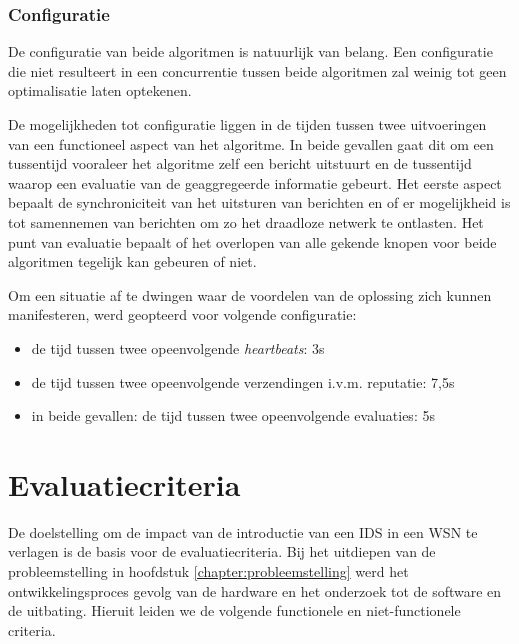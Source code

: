 \subsubsection{Configuratie}

De configuratie van beide algoritmen is natuurlijk van belang. Een configuratie
die niet resulteert in een concurrentie tussen beide algoritmen zal weinig tot
geen optimalisatie laten optekenen.

De mogelijkheden tot configuratie liggen in de tijden tussen twee uitvoeringen
van een functioneel aspect van het algoritme. In beide gevallen gaat dit om een
tussentijd vooraleer het algoritme zelf een bericht uitstuurt en de tussentijd
waarop een evaluatie van de geaggregeerde informatie gebeurt. Het eerste aspect
bepaalt de synchroniciteit van het uitsturen van berichten en of er
mogelijkheid is tot samennemen van berichten om zo het draadloze netwerk te
ontlasten. Het punt van evaluatie bepaalt of het overlopen van alle gekende
knopen voor beide algoritmen tegelijk kan gebeuren of niet.

Om een situatie af te dwingen waar de voordelen van de oplossing zich kunnen
manifesteren, werd geopteerd voor volgende configuratie:

\begin{itemize}[noitemsep, topsep=0pt, partopsep=0pt]

  \item de tijd tussen twee opeenvolgende \emph{heartbeats}: 3s

  \item de tijd tussen twee opeenvolgende verzendingen i.v.m. reputatie: 7,5s

  \item in beide gevallen: de tijd tussen twee opeenvolgende evaluaties: 5s

\end{itemize}

\vspace{-3mm}

\section{Evaluatiecriteria}
\label{section:criteria}

De doelstelling om de impact van de introductie van een IDS in een WSN te
verlagen is de basis voor de evaluatiecriteria. Bij het uitdiepen van de
probleemstelling in hoofdstuk \ref{chapter:probleemstelling} werd het
ontwikkelingsproces gevolg van de hardware en het onderzoek tot de software en
de uitbating. Hieruit leiden we de volgende functionele en niet-functionele
criteria.

